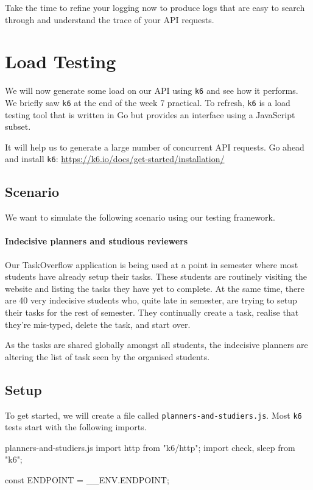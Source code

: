 \documentclass{csse4400}
\begin{document}
Take the time to refine your logging now to produce logs that are easy to search through and understand the trace of your API requests.


\section{Load Testing}

We will now generate some load on our API using \texttt{k6} and see how it performs.
We briefly saw \texttt{k6} at the end of the week 7 practical.
To refresh, \texttt{k6} is a load testing tool that is written in Go but provides an interface using a JavaScript subset.

It will help us to generate a large number of concurrent API requests.
Go ahead and install \texttt{k6}:
\url{https://k6.io/docs/get-started/installation/}

\subsection{Scenario}
We want to simulate the following scenario using our testing framework.

\paragraph{Indecisive planners and studious reviewers}
Our TaskOverflow application is being used at a point in semester where most students have already setup their tasks.
These students are routinely visiting the website and listing the tasks they have yet to complete.
At the same time, there are 40 very indecisive students who,
quite late in semester,
are trying to setup their tasks for the rest of semester.
They continually create a task,
realise that they're mis-typed,
delete the task,
and start over.

As the tasks are shared globally amongst all students,
the indecisive planners are altering the list of task seen by the organised students.

\subsection{Setup}
To get started,
we will create a file called \texttt{planners-and-studiers.js}.
Most \texttt{k6} tests start with the following imports.

\begin{code}[language=JavaScript,numbers=none]{planners-and-studiers.js}
import http from "k6/http";
import { check, sleep } from "k6";

const ENDPOINT = __ENV.ENDPOINT;
\end{code}
\end{document}
